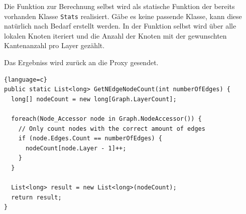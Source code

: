 Die Funktion zur Berechnung selbst wird als statische Funktion der bereits vorhanden Klasse \verb|Stats| realisiert. Gäbe es keine passende Klasse, kann diese natürlich nach Bedarf erstellt werden.
In der Funktion selbst wird über alle lokalen Knoten iteriert und die Anzahl der Knoten mit der gewunschten Kantenanzahl pro Layer gezählt. 

Das Ergebniss wird zurück an die Proxy gesendet.

\begin{lstlisting}{language=c}
public static List<long> GetNEdgeNodeCount(int numberOfEdges) {
  long[] nodeCount = new long[Graph.LayerCount];

  foreach(Node_Accessor node in Graph.NodeAccessor()) {
    // Only count nodes with the correct amount of edges
    if (node.Edges.Count == numberOfEdges) {
      nodeCount[node.Layer - 1]++;
    }
  }

  List<long> result = new List<long>(nodeCount);
  return result;
}
\end{lstlisting}




